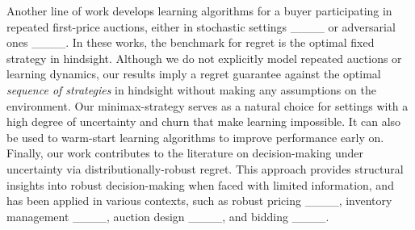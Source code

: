 Another line of work develops learning algorithms for a buyer participating in repeated first-price auctions, either in stochastic settings ____ or adversarial ones ____. In these works, the benchmark for regret is the optimal fixed strategy in hindsight. Although we do not explicitly model repeated auctions or learning dynamics, our results imply a regret guarantee against the optimal \emph{sequence of strategies} in hindsight without making any assumptions on the environment. Our minimax-strategy serves as a natural choice for settings with a high degree of uncertainty and churn that make learning impossible. It can also be used to warm-start learning algorithms to improve performance early on. Finally, our work contributes to the literature on decision-making under uncertainty via distributionally-robust regret. This approach provides structural insights into robust decision-making when faced with limited information, and has been applied in various contexts, such as robust pricing ____, inventory management ____, auction design ____, and bidding ____.